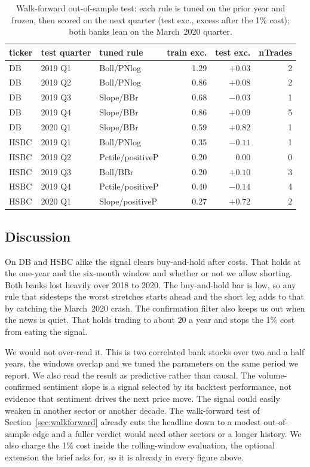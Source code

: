 \documentclass[12pt,a4paper]{article}
\begin{document}
\begin{table}[ht]
\centering
\footnotesize
\setlength{\tabcolsep}{5pt}
\begin{tabular}{lllrrr}
\toprule
ticker & test quarter & tuned rule & train exc. & test exc. & nTrades \\
\midrule
DB   & 2019 Q1 & Boll/PNlog       & 1.29 & $+0.03$ & 2 \\
DB   & 2019 Q2 & Boll/PNlog       & 0.86 & $+0.08$ & 2 \\
DB   & 2019 Q3 & Slope/BBr        & 0.68 & $-0.03$ & 1 \\
DB   & 2019 Q4 & Slope/BBr        & 0.86 & $+0.09$ & 5 \\
DB   & 2020 Q1 & Slope/BBr        & 0.59 & $+0.82$ & 1 \\
\addlinespace
HSBC & 2019 Q1 & Boll/PNlog       & 0.35 & $-0.11$ & 1 \\
HSBC & 2019 Q2 & Pctile/positiveP & 0.20 & $0.00$  & 0 \\
HSBC & 2019 Q3 & Boll/BBr         & 0.20 & $+0.10$ & 3 \\
HSBC & 2019 Q4 & Pctile/positiveP & 0.40 & $-0.14$ & 4 \\
HSBC & 2020 Q1 & Slope/positiveP  & 0.27 & $+0.72$ & 2 \\
\bottomrule
\end{tabular}
\caption{Walk-forward out-of-sample test: each rule is tuned on the prior year
and frozen, then scored on the next quarter (test exc., excess after the 1\%
cost); both banks lean on the March~2020 quarter.}
\label{tab:walkforward}
\end{table}

\subsection{Discussion}
On DB and HSBC alike the signal clears buy-and-hold after costs. That holds at
the one-year and the six-month window and whether or not we allow shorting.
Both banks lost heavily over 2018 to 2020. The buy-and-hold bar is low, so any
rule that sidesteps the worst stretches starts ahead and the short leg adds to
that by catching the March~2020 crash. The confirmation filter also keeps us
out when the news is quiet. That holds trading to about $20$ a year and stops
the 1\% cost from eating the signal.

We would not over-read it. This is two correlated bank stocks
over two and a half years, the windows overlap and we tuned the parameters on
the same period we report. We also read the result as predictive rather than
causal. The volume-confirmed sentiment slope is a signal selected by its
backtest performance, not evidence that sentiment drives the next price move.
The signal could easily weaken in another sector or another decade. The
walk-forward test of Section~\ref{sec:walkforward} already cuts the headline
down to a modest out-of-sample edge and a fuller verdict would need other
sectors or a longer history. We also charge the 1\% cost
inside the rolling-window evaluation, the optional extension the brief asks for,
so it is already in every figure above.
\end{document}
